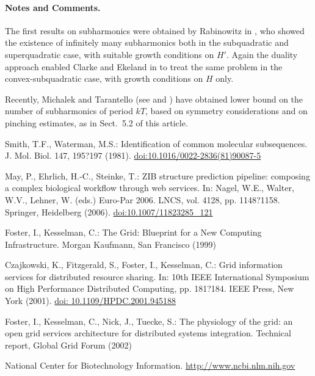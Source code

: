 \documentclass{svproc}
\begin{document}
\paragraph{Notes and Comments.}
The first results on subharmonics were
obtained by Rabinowitz in \cite{fo:kes:nic:tue}, who showed the existence of
infinitely many subharmonics both in the subquadratic and superquadratic
case, with suitable growth conditions on $H'$. Again the duality
approach enabled Clarke and Ekeland in \cite{may:ehr:stein} to treat the
same problem in the convex-subquadratic case, with growth conditions on
$H$ only.

Recently, Michalek and Tarantello (see \cite{fost:kes} and \cite{czaj:fitz})
have obtained lower bound on the number of subharmonics of period $kT$,
based on symmetry considerations and on pinching estimates, as in
Sect.~5.2 of this article.

%
%
\begin{thebibliography}{6}
%

Smith, T.F., Waterman, M.S.: Identification of common molecular subsequences.
J. Mol. Biol. 147, 195?197 (1981). \url{doi:10.1016/0022-2836(81)90087-5}

May, P., Ehrlich, H.-C., Steinke, T.: ZIB structure prediction pipeline:
composing a complex biological workflow through web services.
In: Nagel, W.E., Walter, W.V., Lehner, W. (eds.) Euro-Par 2006.
LNCS, vol. 4128, pp. 1148?1158. Springer, Heidelberg (2006).
\url{doi:10.1007/11823285_121}

Foster, I., Kesselman, C.: The Grid: Blueprint for a New Computing Infrastructure.
Morgan Kaufmann, San Francisco (1999)

Czajkowski, K., Fitzgerald, S., Foster, I., Kesselman, C.: Grid information services
for distributed resource sharing. In: 10th IEEE International Symposium
on High Performance Distributed Computing, pp. 181?184. IEEE Press, New York (2001).
\url{doi: 10.1109/HPDC.2001.945188}

Foster, I., Kesselman, C., Nick, J., Tuecke, S.: The physiology of the grid: an open grid services architecture for distributed systems integration. Technical report, Global Grid
Forum (2002)

National Center for Biotechnology Information. \url{http://www.ncbi.nlm.nih.gov}


\end{thebibliography}
\end{document}
